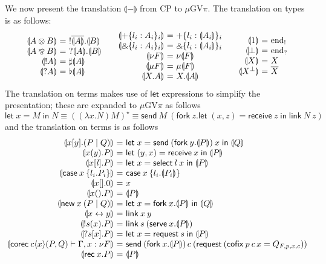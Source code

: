 \documentclass[orivec,envcountsame]{llncs}
\makeatletter
\newcommand{\with}{\mathbin\binampersand}
\newcommand{\parr}{\mathbin\bindnasrepma}
\newcommand{\cpdual}[1]{#1^\perp}
\newcommand{\cpbang}[1]{{! #1}}
\newcommand{\cpquery}[1]{{? #1}}
\newcommand{\gvdual}[1]{\overline{#1}}
\newcommand{\gvout}[2]{{!#1.#2}}
\newcommand{\gvin}[2]{{?#1.#2}}
\newcommand{\outterm}{\mathrm{end}_!}
\newcommand{\interm}{\mathrm{end}_?}
\newcommand{\gvserver}[1]{\flat #1}
\newcommand{\gvservice}[1]{\sharp #1}
\newcommand{\cptyp}[2]{#1 \vdash #2}
\newcommand{\mkwd}[1]{\mathsf{#1}}
\newcommand{\link}[2]{#1 \leftrightarrow #2}
\newcommand{\cut}[4]{\mkwd{new}\:#1 \: (#3 \mid #4)}
\newcommand{\replicate}[2]{{!#1(#2)}}
\newcommand{\derelict}[2]{{?#1[#2]}}
\newcommand{\rec}[1]{\mkwd{rec}\:#1}
\newcommand{\corec}[5]{\mkwd{corec}\:#1 \langle #2 \rangle (#4,#5)}
\newcommand{\clabel}[1]{\mathrm{#1}}
\renewcommand{\case}[2]{\mkwd{case}\:#1\:\{#2\}}
\newcommand{\sel}[2]{#1[\clabel{#2}]}
\newcommand{\gvsend}[2]{\mkwd{send}\:#1\:#2}
\newcommand{\gvreceive}[1]{\mkwd{receive}\:#1}
\newcommand{\gvlet}[3]{\mkwd{let}\;#1 = #2\;\mkwd{in}\;#3}
\newcommand{\gvselect}[2]{\mkwd{select}\:#1\:#2}
\newcommand{\gvcase}[2]{\mkwd{case}\:#1\:\{#2\}}
\newcommand{\gvlink}[2]{\mkwd{link}\:#1\:#2}
\newcommand{\gvfork}[2]{\mkwd{fork}\:#1.#2}
\newcommand{\lrkwd}{\mkwd{cofix}}
\newcommand{\gvfix}[3]{\lrkwd\:#1\:#2 = #3}
\newcommand{\gvserve}[2]{\mkwd{serve}\:#1.#2}
\newcommand{\gvrequest}[1]{\mkwd{request}\:#1}
\newcommand{\gvreceivek}[4]{\gvlet{({#1}, {#2})}{\gvreceive{#3}}{#4}}
\newcommand{\key}{\mkwd}
\newcommand{\togv}[1]{\llparenthesis #1 \rrparenthesis}
\newcommand{\topi}[1]{({#1})^\star}
\newcommand{\gvpi}{$\mu\mathrm{GV}\pi$\xspace}
\newcommand{\ba}{\begin{array}}
\newcommand{\ea}{\end{array}}
\newenvironment{equations}{\[\ba{@{}r@{~}c@{~}l@{}}}{\ea\]}
\newenvironment{eqs}{\ba{@{}r@{~}c@{~}l@{}}}{\ea}
\makeatother
\begin{document}
We now present the translation $\togv{-}$ from CP to \gvpi. The translation on types is as follows:
\[
\ba{@{}c@{\qquad}c@{\qquad}c@{}}
\begin{eqs}
\togv{A \otimes B} &=& \gvout{\gvdual{\togv{A}}}{\togv{B}} \\
\togv{A \parr B}   &=& \gvin{\togv{A}}{\togv{B}} \\
\togv{\cpbang{A}}   &=& \gvservice{\togv{A}} \\
\togv{\cpquery{A}}  &=& \gvserver{\togv{A}} \\
\end{eqs}
&
\begin{eqs}
\togv{+\{l_i:A_i\}_i}     &=& +\{l_i:\togv{A_i}\}_i  \\
\togv{\with\{l_i:A_i\}_i} &=& \with\{l_i:\togv{A_i}\}_i \\
\togv{\nu F} &=& \nu \togv{F} \\
\togv{\mu F} &=& \mu \togv{F} \\
\togv{X.A} &=& X.\togv{A} \\
\end{eqs}
&
\begin{eqs}
\togv{1}           &=& \outterm \\
\togv{\bot}              &=& \interm \\
\togv{X}            &=& X \\
\togv{\cpdual{X}}   &=& \gvdual{X} \\
\end{eqs}
\ea
\]
The translation on terms makes use of $\key{let}$ expressions to simplify the presentation; these
are expanded to \gvpi as follows
\[
\gvlet{x}{M}{N} \equiv
  \topi{(\lambda x.N) M} \equiv
  \gvsend{M}{(\gvfork{z}{\gvreceivek{x}{z}{z}{\gvlink{N}{z}}})}
\]%
and the translation on terms is as follows
\begin{equations}
  \togv{x[y].(P \mid Q)} &=&
    \gvlet{x}{\gvsend{(\gvfork{y}{\togv{P}})}{x}}{\togv{Q}} \\
  \togv{x(y).P} &=&
    \gvlet{(y,x)}{\gvreceive{x}}{\togv{P}} \\
  \togv{\sel{x}{\mathit{l}}.P} &=&
    \gvlet{x}{\gvselect{l}{x}}{\togv{P}} \\
  \togv{\case{x}{l_i.P_i}} &=&
    \gvcase{x}{l_i.\togv{P_i}} \\
  \togv{x[].0} &=& x \\
  \togv{x().P} &=& \togv{P} \\
  \togv{\cut{x}{}{P}{Q}} &=&
    \gvlet{x}{\gvfork{x}{\togv{P}}}{\togv{Q}} \\
  \togv{\link{x}{y}} &=& \gvlink{x}{y} \\
  \togv{\replicate{s}{x}.P} &=&
    \gvlink{s}{(\gvserve{x}{\togv{P}})} \\
  \togv{\derelict{s}{x}.P} &=&
    \gvlet{x}{\gvrequest{s}}{\togv{P}} \\
  \togv{\cptyp{\corec{c}{x}{}{P}{Q}}{\Gamma, x:\nu F}} &=&
    \gvsend{(\gvfork{x}{\togv{P}})\,c}{(\gvrequest{(\gvfix{p}{c\,x}{Q_{F,p,x,c}})})} \\
  \togv{\rec{x}.P} &=& \togv{P} \\
\end{equations}%
\end{document}
